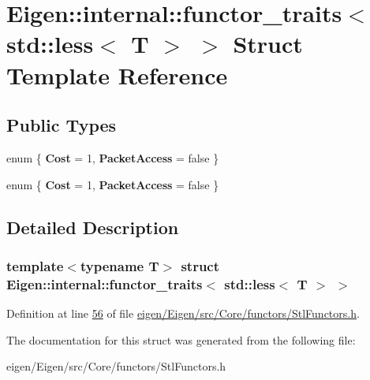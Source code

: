 \hypertarget{struct_eigen_1_1internal_1_1functor__traits_3_01std_1_1less_3_01_t_01_4_01_4}{}\section{Eigen\+:\+:internal\+:\+:functor\+\_\+traits$<$ std\+:\+:less$<$ T $>$ $>$ Struct Template Reference}
\label{struct_eigen_1_1internal_1_1functor__traits_3_01std_1_1less_3_01_t_01_4_01_4}
\subsection*{Public Types}
\begin{DoxyCompactItemize}
\item 
\mbox{\label{struct_eigen_1_1internal_1_1functor__traits_3_01std_1_1less_3_01_t_01_4_01_4_ae5d4c79c118bf6baf37c208a950288a9}} 
enum \{ {\bfseries Cost} = 1, 
{\bfseries Packet\+Access} = false
 \}
\item 
\mbox{\label{struct_eigen_1_1internal_1_1functor__traits_3_01std_1_1less_3_01_t_01_4_01_4_a554ebcd011bd0756a05b0c2f60b6a8e7}} 
enum \{ {\bfseries Cost} = 1, 
{\bfseries Packet\+Access} = false
 \}
\end{DoxyCompactItemize}


\subsection{Detailed Description}
\subsubsection*{template$<$typename T$>$\newline
struct Eigen\+::internal\+::functor\+\_\+traits$<$ std\+::less$<$ T $>$ $>$}



Definition at line \hyperlink{eigen_2_eigen_2src_2_core_2functors_2_stl_functors_8h_source_l00056}{56} of file \hyperlink{eigen_2_eigen_2src_2_core_2functors_2_stl_functors_8h_source}{eigen/\+Eigen/src/\+Core/functors/\+Stl\+Functors.\+h}.



The documentation for this struct was generated from the following file\+:\begin{DoxyCompactItemize}
\item 
eigen/\+Eigen/src/\+Core/functors/\+Stl\+Functors.\+h\end{DoxyCompactItemize}
